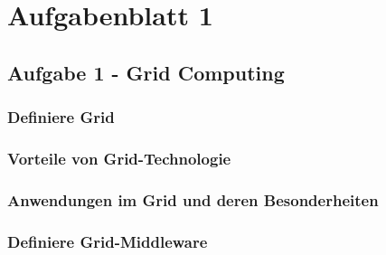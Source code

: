 \section{Aufgabenblatt 1}

\subsection{Aufgabe 1 - Grid Computing}

\subsubsection{Definiere Grid}
\subsubsection{Vorteile von Grid-Technologie}
\subsubsection{Anwendungen im Grid und deren Besonderheiten}
\subsubsection{Definiere Grid-Middleware}